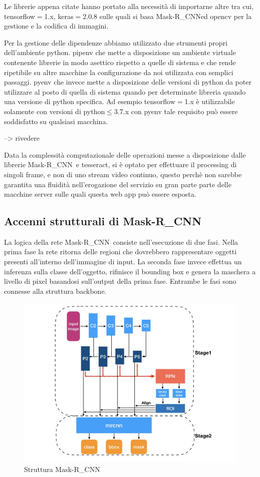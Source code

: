 \documentclass[12pt,a4paper]{article}
\newcommand{\mrcnn}{Mask-R\_CNN}
\begin{document}
Le librerie appena citate hanno portato alla necessità di importarne
altre tra cui, tensorflow$=$1.x, keras$=$2.0.8 sulle quali si basa
\mrcnn ed opencv per la gestione e la codifica di immagini.

Per la gestione delle dipendenze abbiamo utilizzato
due strumenti propri dell'ambiente python. pipenv che mette a
disposizione un ambiente virtuale contenente librerie in
modo asettico rispetto a quelle di sistema e che rende ripetibile su
altre macchine la configurazione da noi utilizzata con semplici
passaggi. pyenv che invece mette a disposizione delle versioni di python
da poter utilizzare al posto di quella di sistema quando per determinate 
libreria quando una versione di python specifica.
Ad esempio tensorflow$=$1.x è utilizzabile solamente con versioni di
python$\leq$3.7.x con pyenv tale requisito può essere soddisfatto su
qualsiasi macchina.

--> rivedere %

Data la complessità computazionale delle operazioni messe a disposizione
dalle librerie \mrcnn\ e tesseract, si è optato per effettuare il
processing di singoli frame, e non di uno stream video
continuo, questo perchè non sarebbe garantita una fluidità
nell'erogazione del servizio su gran parte parte delle macchine server
sulle quali questa web app può essere esposta.

\subsection{Accenni strutturali di \mrcnn}

La logica della rete \mrcnn\ consiste nell'esecuzione di due fasi. Nella prima
fase la rete ritorna delle regioni che dovrebbero rappresentare
oggetti presenti all'interno dell'immagine di input. La seconda fase invece
effettua un inferenza sulla classe dell'oggetto, rifinisce il bounding
box e genera la maschera a livello di pixel basandosi sull'output
della prima fase. Entrambe le fasi sono connesse alla struttura
backbone.

\begin{figure}[H]
    \caption{Struttura \mrcnn}
    \centering
    \includegraphics[width=\textwidth,height=\textheight,keepaspectratio]{mask_description.jpg}
\end{figure}
\end{document}
